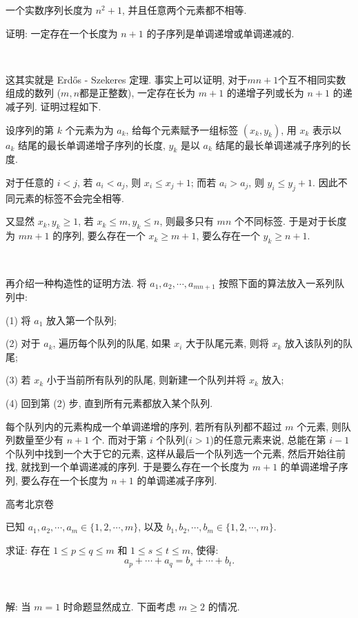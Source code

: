 一个实数序列长度为 $n^2 + 1$, 并且任意两个元素都不相等. 

证明: 一定存在一个长度为 $n + 1$ 的子序列是单调递增或单调递减的.

~

这其实就是 Erd\H{o}s - Szekeres 定理. 事实上可以证明, 对于$mn + 1$个互不相同实数组成的数列 ($m,n$都是正整数), 一定存在长为 $m+1$ 的递增子列或长为 $n+1$ 的递减子列. 证明过程如下.

设序列的第 $k$ 个元素为为 $a_k$, 给每个元素赋予一组标签 $(x_k, y_k)$, 用 $x_k$ 表示以 $a_k$ 结尾的最长单调递增子序列的长度, $y_k$ 是以 $a_k$ 结尾的最长单调递减子序列的长度. 

对于任意的 $i < j$, 若 $a_i < a_j$, 则 $x_i \le x_j + 1$; 而若 $a_i > a_j$, 则 $y_i \le y_j + 1$. 因此不同元素的标签不会完全相等. 

又显然 $x_k, y_k \ge 1$, 若 $x_k \le m, y_k \le n$, 则最多只有 $mn$ 个不同标签. 于是对于长度为 $mn + 1$ 的序列, 要么存在一个 $x_k \ge m + 1$, 要么存在一个 $y_k \ge n + 1$.

~

再介绍一种构造性的证明方法. 将 $a_1, a_2, \cdots, a_{mn+1}$ 按照下面的算法放入一系列队列中:

(1) 将 $a_1$ 放入第一个队列;

(2) 对于 $a_k$, 遍历每个队列的队尾, 如果 $x_i$ 大于队尾元素, 则将 $x_k$ 放入该队列的队尾; 

(3) 若 $x_k$ 小于当前所有队列的队尾, 则新建一个队列并将 $x_k$ 放入;

(4) 回到第 (2) 步, 直到所有元素都放入某个队列.

每个队列内的元素构成一个单调递增的序列, 若所有队列都不超过 $m$ 个元素, 则队列数量至少有 $n + 1$ 个. 而对于第 $i$ 个队列($i > 1$)的任意元素来说, 总能在第 $i - 1$ 个队列中找到一个大于它的元素, 这样从最后一个队列选一个元素, 然后开始往前找, 就找到一个单调递减的序列. 于是要么存在一个长度为 $m + 1$ 的单调递增子序列, 要么存在一个长度为 $n + 1$ 的单调递减子序列.


\newpage
 高考北京卷

已知 $a_1,a_2,\cdots,a_m\in\{1,2,\cdots,m\}$, 以及 $b_1,b_2,\cdots,b_m\in\{1,2,\cdots,m\}$. 

求证: 存在
$1\le p\le q\le m$ 和 $1\le s\le t\le m$, 使得: 
$$ a_p+\cdots+a_q=b_s+\cdots+b_t .$$

~

解: 当 $m=1$ 时命题显然成立. 下面考虑 $m\ge 2$ 的情况.

